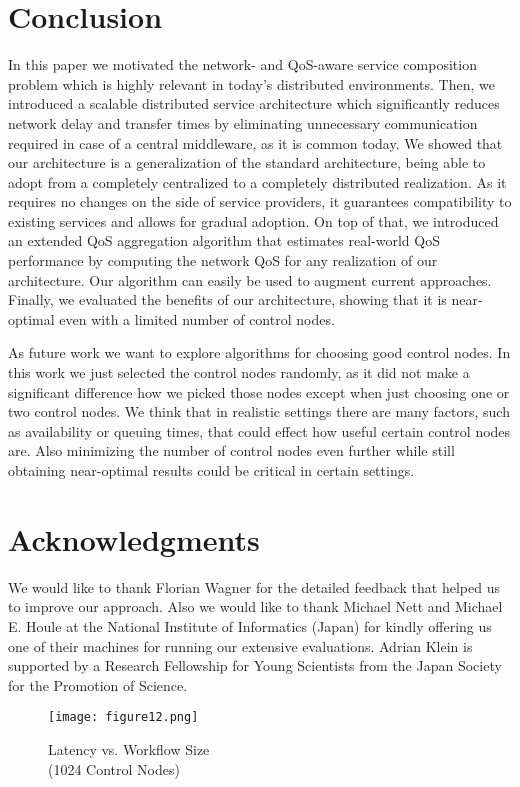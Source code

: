 \documentclass[10pt, conference, compsocconf]{IEEEtran}
\newcommand{\oneImage}{3.2in}
\begin{document}
\section{Conclusion}
\label{conclusion}
\noindent In this paper we motivated the network- and QoS-aware service composition problem
	which is highly relevant in today's distributed environments.
Then, we introduced a scalable distributed service architecture which significantly reduces network delay and transfer times
	by eliminating unnecessary communication required in case of a central middleware, as it is common today.
We showed that our architecture is a generalization of the standard architecture,
	being able to adopt from a completely centralized to a completely distributed realization.
As it requires no changes on the side of service providers,
	it guarantees compatibility to existing services and allows for gradual adoption.
On top of that, we introduced an extended QoS aggregation algorithm
	that estimates real-world QoS performance by computing the network QoS for any realization of our architecture.
Our algorithm can easily be used to augment current approaches.
Finally, we evaluated the benefits of our architecture,
	showing that it is near-optimal even with a limited number of control nodes.

As future work we want to explore algorithms for choosing good control nodes.
In this work we just selected the control nodes randomly, as it did not make a significant difference how we picked those nodes
	except when just choosing one or two control nodes.
We think that in realistic settings there are many factors,
	such as availability or queuing times, that could effect how useful certain control nodes are.
Also minimizing the number of control nodes even further while still obtaining near-optimal results could be critical in certain settings.

\section{Acknowledgments}
\noindent We would like to thank Florian Wagner for the detailed feedback that helped us to improve our approach.
Also we would like to thank Michael Nett and Michael E. Houle at the National Institute of Informatics (Japan) for kindly offering us one of their machines for running our extensive evaluations.
Adrian Klein is supported by a Research Fellowship for Young Scientists from the Japan Society for the Promotion of Science.

\begin{figure}[t]
	\centering
	\texttt{[image: figure12.png]}
	\caption{Latency vs. Workflow Size\\(1024 Control Nodes)}
	\label{fig:eval_wf}
\end{figure}



\end{document}
